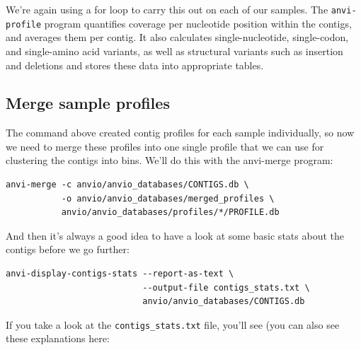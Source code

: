\documentclass[
]{book}
\begin{document}
We're again using a for loop to carry this out on each of our samples. The \texttt{anvi-profile} program quantifies coverage per nucleotide position within the contigs, and averages them per contig. It also calculates single-nucleotide, single-codon, and single-amino acid variants, as well as structural variants such as insertion and deletions and stores these data into appropriate tables.

\subsection{Merge sample profiles}\label{merge-sample-profiles}

The command above created contig profiles for each sample individually, so now we need to merge these profiles into one single profile that we can use for clustering the contigs into bins. We'll do this with the anvi-merge program:

\begin{verbatim}
anvi-merge -c anvio/anvio_databases/CONTIGS.db \
           -o anvio/anvio_databases/merged_profiles \
           anvio/anvio_databases/profiles/*/PROFILE.db
\end{verbatim}

And then it's always a good idea to have a look at some basic stats about the contigs before we go further:

\begin{verbatim}
anvi-display-contigs-stats --report-as-text \
                           --output-file contigs_stats.txt \
                           anvio/anvio_databases/CONTIGS.db
\end{verbatim}

If you take a look at the \texttt{contigs\_stats.txt} file, you'll see (you can also see these explanations here:
\end{document}
